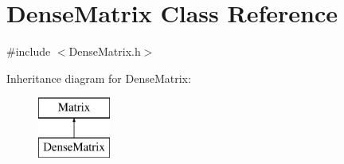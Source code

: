 \hypertarget{class_dense_matrix}{}\section{Dense\+Matrix Class Reference}
\label{class_dense_matrix}


{\ttfamily \#include $<$Dense\+Matrix.\+h$>$}

Inheritance diagram for Dense\+Matrix\+:\begin{figure}[H]
\begin{center}
\leavevmode
\includegraphics[height=2.000000cm]{class_dense_matrix}
\end{center}
\end{figure}
